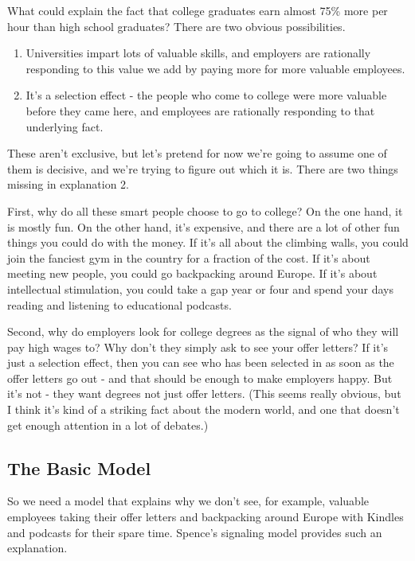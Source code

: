 \documentclass[
  11pt,
]{article}
\providecommand{\tightlist}{%
  \setlength{\itemsep}{0pt}\setlength{\parskip}{0pt}}
\begin{document}
What could explain the fact that college graduates earn almost 75\% more
per hour than high school graduates? There are two obvious
possibilities.

\begin{enumerate}
\def\labelenumi{\arabic{enumi}.}
\tightlist
\item
  Universities impart lots of valuable skills, and employers are
  rationally responding to this value we add by paying more for more
  valuable employees.
\item
  It's a selection effect - the people who come to college were more
  valuable before they came here, and employees are rationally
  responding to that underlying fact.
\end{enumerate}

These aren't exclusive, but let's pretend for now we're going to assume
one of them is decisive, and we're trying to figure out which it is.
There are two things missing in explanation 2.

First, why do all these smart people choose to go to college? On the one
hand, it is mostly fun. On the other hand, it's expensive, and there are
a lot of other fun things you could do with the money. If it's all about
the climbing walls, you could join the fanciest gym in the country for a
fraction of the cost. If it's about meeting new people, you could go
backpacking around Europe. If it's about intellectual stimulation, you
could take a gap year or four and spend your days reading and listening
to educational podcasts.

Second, why do employers look for college degrees as the signal of who
they will pay high wages to? Why don't they simply ask to see your offer
letters? If it's just a selection effect, then you can see who has been
selected in as soon as the offer letters go out - and that should be
enough to make employers happy. But it's not - they want degrees not
just offer letters. (This seems really obvious, but I think it's kind of
a striking fact about the modern world, and one that doesn't get enough
attention in a lot of debates.)

\hypertarget{the-basic-model}{%
\subsection{The Basic Model}\label{the-basic-model}}

So we need a model that explains why we don't see, for example, valuable
employees taking their offer letters and backpacking around Europe with
Kindles and podcasts for their spare time. Spence's signaling model
provides such an explanation.
\end{document}
